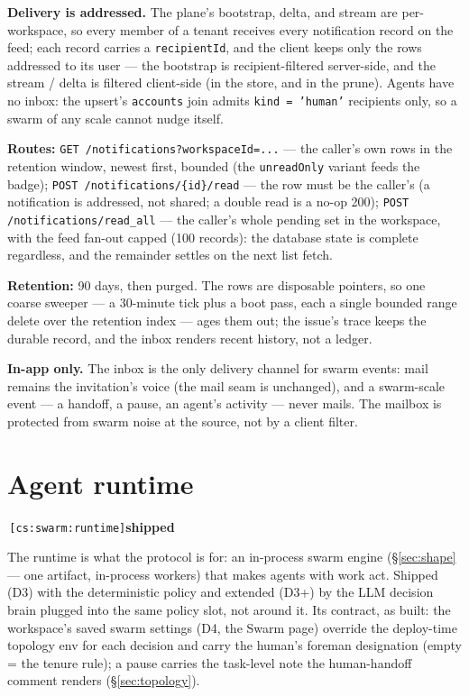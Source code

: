 \documentclass[11pt,a4paper]{report}
\newcommand{\cs}[1]{\,\texttt{\scriptsize[cs:#1]}\label{cs:#1}}
\newcommand{\shipped}{\textbf{\textcolor{green!45!black}{shipped}}}
\begin{document}
\textbf{Delivery is addressed.} The plane's bootstrap, delta, and stream
are per-workspace, so every member of a tenant receives every
notification record on the feed; each record carries a
\texttt{recipientId}, and the client keeps only the rows addressed to
its user --- the bootstrap is recipient-filtered server-side, and the
stream / delta is filtered client-side (in the store, and in the
prune). Agents have no inbox: the upsert's \texttt{accounts} join
admits \texttt{kind = 'human'} recipients only, so a swarm of any scale
cannot nudge itself.

\textbf{Routes:} \texttt{GET /notifications?workspaceId=...} --- the
caller's own rows in the retention window, newest first, bounded (the
\texttt{unreadOnly} variant feeds the badge); \texttt{POST
/notifications/\{id\}/read} --- the row must be the caller's (a
notification is addressed, not shared; a double read is a no-op 200);
\texttt{POST /notifications/read\_all} --- the caller's whole pending
set in the workspace, with the feed fan-out capped (100 records): the
database state is complete regardless, and the remainder settles on the
next list fetch.

\textbf{Retention:} 90 days, then purged. The rows are disposable
pointers, so one coarse sweeper --- a 30-minute tick plus a boot pass,
each a single bounded range delete over the retention index --- ages
them out; the issue's trace keeps the durable record, and the inbox
renders recent history, not a ledger.

\textbf{In-app only.} The inbox is the only delivery channel for swarm
events: mail remains the invitation's voice (the mail seam is
unchanged), and a swarm-scale event --- a handoff, a pause, an agent's
activity --- never mails. The mailbox is protected from swarm noise at
the source, not by a client filter.

\section{Agent runtime}
\label{sec:runtime}
\cs{swarm:runtime}\shipped\

The runtime is what the protocol is for: an in-process swarm engine
(\S\ref{sec:shape} --- one artifact, in-process workers) that makes
agents with work act. Shipped (D3) with the deterministic policy and
extended (D3+) by the LLM decision brain plugged into the same policy
slot, not around it. Its contract, as built: the workspace's saved swarm
settings (D4, the Swarm page) override the deploy-time topology env for
each decision and carry the human's foreman designation (empty = the
tenure rule); a pause carries the task-level note the human-handoff
comment renders (\S\ref{sec:topology}).
\end{document}
